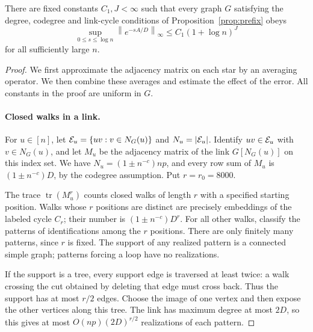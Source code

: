 \begin{proposition}\label{prop:semigroup}
There are fixed constants $C_1,J<\infty$ such that every graph $G$
satisfying the degree, codegree and link-cycle conditions of
Proposition~\ref{prop:prefix} obeys
\begin{equation}\label{eq:semigroup}
 \sup_{0\le s\le\log n}
 \left\lVert e^{-sA/D}\right\rVert_\infty
 \le C_1(1+\log n)^J
\end{equation}
for all sufficiently large $n$.
\end{proposition}

\begin{proof}
We first approximate the adjacency matrix on each star by an averaging
operator.  We then combine these averages and estimate the effect of
the error.  All constants in the proof are uniform in $G$.

\paragraph{Closed walks in a link.}
For $u\in[n]$, let $\mathcal E_u=\{uv:v\in N_G(u)\}$ and
$N_u=|\mathcal E_u|$.  Identify $uv\in\mathcal E_u$ with $v\in N_G(u)$, and let
$M_u$ be the adjacency matrix of the link $G[N_G(u)]$ on this index
set.  We have $N_u=(1\pm n^{-c})np$, and every row sum of $M_u$ is
$(1\pm n^{-c})D$, by the codegree assumption.  Put $r=r_0=8000$.

The trace $\operatorname{tr}(M_u^r)$ counts closed walks of length
$r$ with a specified starting position.  Walks whose $r$ positions
are distinct are precisely embeddings of the labeled cycle $C_r$;
their number is $(1\pm n^{-c})D^r$.  For all other walks, classify
the patterns of identifications among the $r$ positions.  There are
only finitely many patterns, since $r$ is fixed.  The support of any
realized pattern is a connected simple graph; patterns forcing a loop
have no realizations.

If the support is a tree, every support edge is traversed at least
twice: a walk crossing the cut obtained by deleting that edge must
cross back.  Thus the support has at most $r/2$ edges.  Choose the
image of one vertex and then expose the other vertices along this
tree.  The link has maximum degree at most $2D$, so this gives at most
$O(np)(2D)^{r/2}$ realizations of each pattern.


\end{proof}

